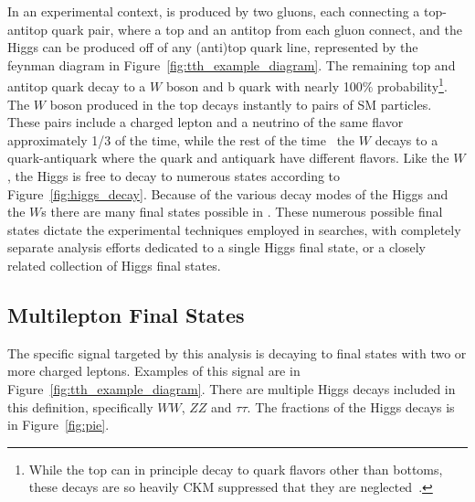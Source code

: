 In an experimental context, \tth is produced by two gluons, each connecting a top-antitop quark pair, where a top and an
antitop from each gluon connect, and the Higgs can be produced off of any (anti)top quark line, represented by the feynman diagram in Figure~\ref{fig:tth_example_diagram}.
The remaining top and antitop quark decay to a $W$ boson and b quark with nearly 100$\%$ probability\footnote{While the top can in principle decay
to quark flavors other than bottoms, these decays are so heavily CKM suppressed that they are
neglected~\cite{pdg}.}. The $W$ boson produced in the top decays instantly to pairs of SM particles. These pairs include a charged lepton and a neutrino of the same
flavor approximately 1/3 of the time, while the rest of the time~\cite{pdg} the $W$ decays to a quark-antiquark where the quark and antiquark have different flavors. 
Like the $W$, the Higgs is free to decay to numerous states according to Figure~\ref{fig:higgs_decay}. Because of the various decay modes of the Higgs and
the $W$s there are many final states possible in \tth. These numerous possible final states dictate the experimental techniques employed in searches,
with completely separate analysis efforts dedicated to a single \tth Higgs final state, or a closely related collection of Higgs final states.


\subsection{Multilepton Final States}
The specific signal targeted by this analysis is \tth decaying to final states with two or more charged leptons. Examples of this signal are in
Figure~\ref{fig:tth_example_diagram}. There are multiple Higgs decays included in this definition, specifically $WW$, $ZZ$ and $\tau\tau$. The fractions of the Higgs decays
is in Figure~\ref{fig:pie}. 


